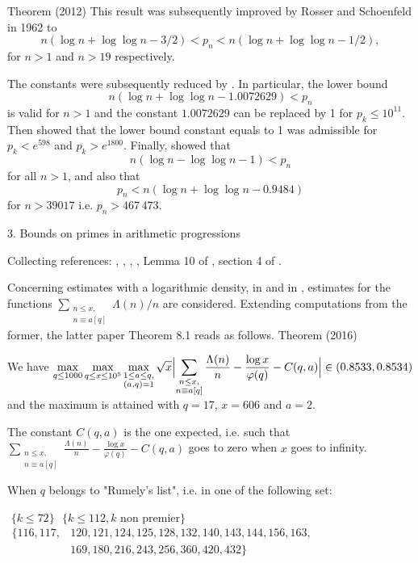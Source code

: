 \begin{thm}{Theorem (2012)}
 This result was subsequently improved by Rosser and Schoenfeld
\cite{Rosser-Schoenfeld*62}
 in 1962 to
$$
n (\log n + \log \log n - 3/2) < p_n < n (\log n + \log\log n -1/2),
$$
for $n > 1$ and $n > 19$  respectively.

The constants  were subsequently reduced by
\cite{Robin*83-1}.
In particular, the lower bound 
$$
n (\log n + \log \log n - 1.0072629) < p_n
$$
is valid for $n>1$ and the constant $1.0072629$ can be replaced by 1 for
$p_k\leq 10^{11}$.
Then 
\cite{Massias-Robin*96}
  showed that the lower bound constant equals to 1 was admissible for
$p_k < e^{598}$
and $p_k > e^{1800}$. Finally,  
\cite{Dusart*99-2}
showed
that
$$
  n(\log n - \log \log n - 1) < p_n
$$ for all $n > 1$, and also that
$$
p_n < n (\log n + \log\log n - 0.9484)
$$ for $n > 39017$ i.e. $p_n > 467\,473$.




  
3. Bounds on primes in arithmetic progressions


Collecting references:
\cite{McCurley*84-2},
\cite{McCurley*84-3},
\cite{Ramare-Rumely*96},
\cite{Dusart*01},
Lemma 10 of \cite{Moree*04},
section 4 of
\cite{Moree-teRiele*04}.


Concerning estimates with a logarithmic density, in
\cite{Ramare*02}
and in
\cite{Ramare*12-0},
estimates for the functions
$\displaystyle\sum_{\substack{n\le x,\\ n\equiv a[q]}}\Lambda(n)/n$
are considered.
Extending computations from the former, the latter paper Theorem 8.1
reads as follows.
Theorem (2016)


  We have
  $\displaystyle
  \max_{q\le 1000}\max_{q\le x\le 10^5}\max_{\substack{1\le a\le q,\\
  (a,q)=1}}
  \sqrt{x}\Bigl|
  \sum_{\substack{n\le x,\\ n\equiv a[q]}}\frac{\Lambda(n)}{n}
  -\frac{\log x}{\varphi(q)}-C(q,a)\Bigr|\in(0.8533,0.8534)
  $
  and the maximum is attained with $q=17$, $x=606$ and $a=2$.
\end{thm}

The constant $C(q,a)$ is the one expected, i.e. such that
$\sum_{\substack{n\le x,\\ n\equiv a[q]}}\frac{\Lambda(n)}{n}
-\frac{\log x}{\varphi(q)}-C(q,a)$ goes to
zero when $x$ goes to infinity.


  When $q$ belongs to "Rumely's list", i.e. in one of the
following set:

    \,\,$\{k\le 72\}$
    \,\,$\{k\le 112, \text{$k$ non premier}\}$
    \,$\begin{aligned}\{116, 117, &120, 121, 124, 125, 128, 132, 140,
     143, 144, 156, 163, \\ &169, 180, 216, 243, 256, 360, 420, 432\}\end{aligned}$

